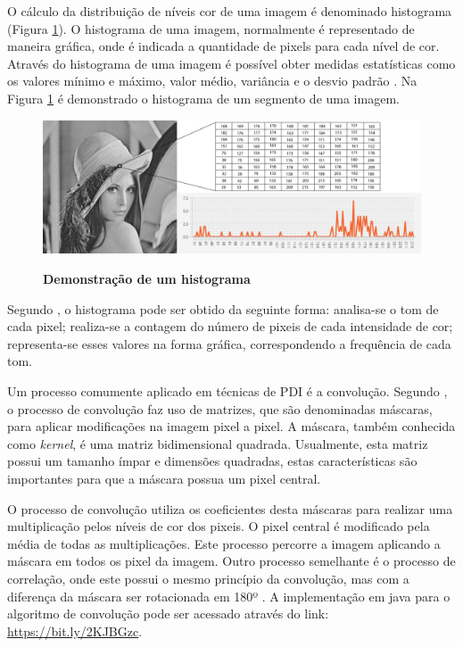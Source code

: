 \documentclass[
	12pt,				%
	oneside,			%
	a4paper,			%
	english,			%
	french,				%
	spanish,			%
	brazil,				%
	]{abntex2}
\begin{document}
O cálculo da distribuição de níveis cor de uma imagem é denominado histograma (Figura \ref{fig:histograma}). O histograma de uma imagem, normalmente é representado de maneira gráfica, onde é indicada a quantidade de pixels para cada nível de cor. Através do histograma de uma imagem é possível obter medidas estatísticas como os valores mínimo e máximo, valor médio, variância e o desvio padrão \cite{gonzalesWoods:2008}. Na Figura \ref{fig:histograma} é demonstrado o histograma de um segmento de uma imagem. 

\begin{figure}[ht]
\centering
\caption{\textbf{Demonstração de um histograma}}
\includegraphics[width=1\textwidth]{imagens/histograma.png}
\label{fig:histograma}
\sourceAuthor
\end{figure}

Segundo \citet{conciAzevedoLeta:2008}, o histograma pode ser obtido da seguinte forma: analisa-se o tom de cada pixel; realiza-se a contagem do número de pixeis de cada intensidade de cor; representa-se esses valores na forma gráfica, correspondendo a frequência de cada tom.

Um processo comumente aplicado em técnicas de PDI é a convolução. Segundo \citet{pedriniSchwartz:2008}, o processo de convolução faz uso de matrizes, que são denominadas máscaras, para aplicar modificações na imagem pixel a pixel. A máscara, também conhecida como \textit{kernel}, é uma matriz bidimensional quadrada. Usualmente, esta matriz possui um tamanho ímpar e dimensões quadradas, estas características são importantes para que a máscara possua um pixel central.

O processo de convolução utiliza os coeficientes desta máscaras para realizar uma multiplicação pelos níveis de cor dos pixeis. O pixel central é modificado pela média de todas as multiplicações. Este processo percorre a imagem aplicando a máscara em todos os pixel da imagem. Outro processo semelhante é o processo de correlação, onde este possui o mesmo princípio da convolução, mas com a diferença da máscara ser rotacionada em 180º \cite{gonzalesWoods:2008}. A implementação em java para o algoritmo de convolução pode ser acessado através do link: \url{https://bit.ly/2KJBGzc}.
\end{document}
